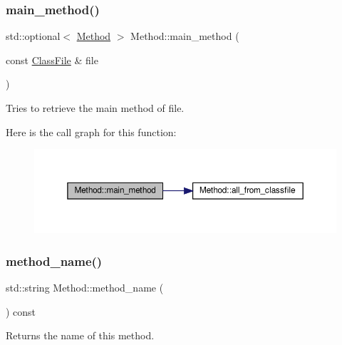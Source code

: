 \subsubsection{\texorpdfstring{main\+\_\+method()}{main\_method()}}
{\footnotesize\ttfamily std\+::optional$<$ \hyperlink{classMethod}{Method} $>$ Method\+::main\+\_\+method (\begin{DoxyParamCaption}\item[{const \hyperlink{classfile_8h_a00b46b60bc40e813e9fb1bb049174346}{Class\+File} \&}]{file }\end{DoxyParamCaption})\hspace{0.3cm}{\ttfamily [static]}}



Tries to retrieve the main method of {\ttfamily file}. 

Here is the call graph for this function\+:
\nopagebreak
\begin{figure}[H]
\begin{center}
\leavevmode
\includegraphics[width=350pt]{classMethod_a74801df628f1be6e2c616cf5feb328b1_cgraph}
\end{center}
\end{figure}
\mbox{\label{classMethod_ab0855cbda89f070acc27ebff025ffd15}} 
\subsubsection{\texorpdfstring{method\+\_\+name()}{method\_name()}}
{\footnotesize\ttfamily std\+::string Method\+::method\+\_\+name (\begin{DoxyParamCaption}{ }\end{DoxyParamCaption}) const}



Returns the name of this method. 

